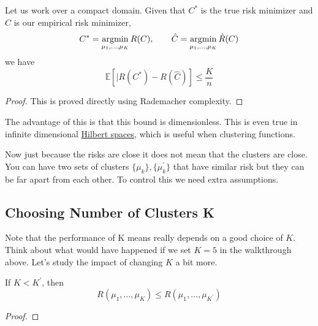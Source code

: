   \begin{theorem}
    \label{thm:2008-gao-deroit-lugacy}
    Let us work over a compact domain. Given that $C^\ast$ is the true risk minimizer and $\hat{C}$ is our empirical risk minimizer, 
    \begin{equation}
      C^\ast = \operatorname*{\arg\!\min}_{\mu_1, \ldots, \mu_K} R(C), \qquad \hat{C} = \operatorname*{\arg\!\min}_{\mu_1, \ldots, \mu_K} \hat{R}(C) 
    \end{equation}
    we have 
    \begin{equation}
      \mathbb{E} \left[ | R(C^\ast) - R(\hat{C}) \right] \leq \frac{K}{n}
    \end{equation}
  \end{theorem}
  \begin{proof}
    This is proved directly using Rademacher complexity. 
  \end{proof}

  The advantage of this is that this bound is dimensionless. This is even true in infinite dimensional \hyperref[fa-def:hilbert-space]{Hilbert spaces}, which is useful when clustering functions. 

  Now just because the risks are close it does not mean that the clusters are close. You can have two sets of clusters $\{\mu_k\}, \{\mu_k^\prime\}$ that have similar risk but they can be far apart from each other. To control this we need extra assumptions. 

\subsection{Choosing Number of Clusters K}

  Note that the performance of K means really depends on a good choice of $K$. Think about what would have happened if we set $K = 5$ in the walkthrough above. Let's study the impact of changing $K$ a bit more. 

  \begin{theorem}
    \label{thm:expected-risk-decreases-as-k-increases}
    If $K < K^\prime$, then 
    \begin{equation}
      R(\mu_1, \ldots, \mu_K) \leq R(\mu_1, \ldots, \mu_{K^\prime})
    \end{equation}
  \end{theorem}
  \begin{proof}
    
  \end{proof}



